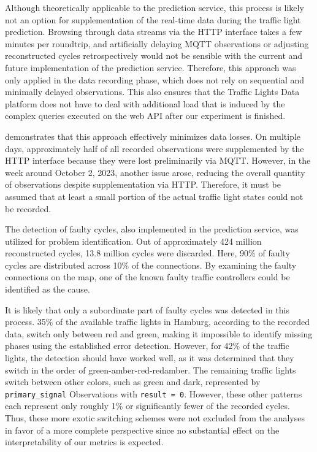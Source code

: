 Although theoretically applicable to the prediction service, this process is likely not an option for supplementation of the real-time data during the traffic light prediction. Browsing through data streams via the HTTP interface takes a few minutes per roundtrip, and artificially delaying MQTT observations or adjusting reconstructed cycles retrospectively would not be sensible with the current and future implementation of the prediction service. Therefore, this approach was only applied in the data recording phase, which does not rely on sequential and minimally delayed observations. This also ensures that the Traffic Lights Data platform does not have to deal with additional load that is induced by the complex queries executed on the web API after our experiment is finished.

 demonstrates that this approach effectively minimizes data losses. On multiple days, approximately half of all recorded observations were supplemented by the HTTP interface because they were lost preliminarily via MQTT. However, in the week around October 2, 2023, another issue arose, reducing the overall quantity of observations despite supplementation via HTTP. Therefore, it must be assumed that at least a small portion of the actual traffic light states could not be recorded.

The detection of faulty cycles, also implemented in the prediction service, was utilized for problem identification. Out of approximately 424 million reconstructed cycles, 13.8 million cycles were discarded. Here, 90\% of faulty cycles are distributed across 10\% of the connections. By examining the faulty connections on the map, one of the known faulty traffic controllers could be identified as the cause.

It is likely that only a subordinate part of faulty cycles was detected in this process. 35\% of the available traffic lights in Hamburg, according to the recorded data, switch only between red and green, making it impossible to identify missing phases using the established error detection. However, for 42\% of the traffic lights, the detection should have worked well, as it was determined that they switch in the order of green-amber-red-redamber. The remaining traffic lights switch between other colors, such as green and dark, represented by \texttt{primary\_signal} Observations with \texttt{result = 0}. However, these other patterns each represent only roughly 1\% or significantly fewer of the recorded cycles. Thus, these more exotic switching schemes were not excluded from the analyses in favor of a more complete perspective since no substantial effect on the interpretability of our metrics is expected.

